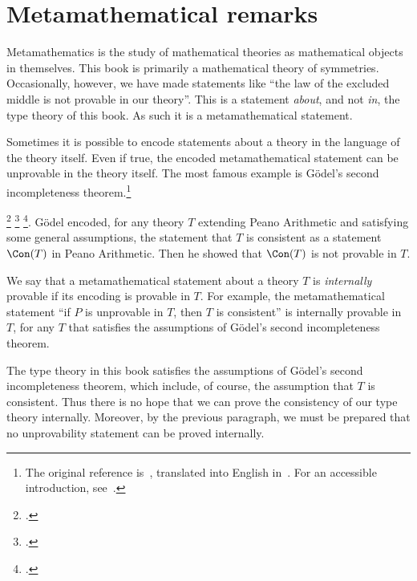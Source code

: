 \chapter{Metamathematical remarks}
\label{app:metamath}

Metamathematics is the study of mathematical theories as
mathematical objects in themselves.
This book is primarily a mathematical theory of symmetries.
Occasionally, however, we have made statements like
``the law of the excluded middle is not provable in our theory''.
This is a statement \emph{about}, and not \emph{in}, the type theory of this book.
As such it is a metamathematical statement.

Sometimes it is possible to encode statements
about a theory in the language of the theory itself.%
Even if true, the encoded metamathematical statement can
be unprovable in the theory itself.
The most famous example is G\"{o}del's second incompleteness theorem.\footnote{%
  The original reference is~\citeauthor{Goedel2nd}\footnotemark{},
  translated into English in~\citeauthor{Heijenoort-source}\footnotemark{}.
  For an accessible introduction, see~\citeauthor{Smullyan-Goedel}\footnotemark{}.}%
\addtocounter{footnote}{-3}%
\footcitetext{Goedel2nd}%
\footcitetext{Heijenoort-source}%
\footcitetext{Smullyan-Goedel}.
G\"{o}del encoded, for any theory $T$ extending Peano Arithmetic and satisfying
some general assumptions, the statement that $T$ is consistent as
a statement $\Con(T)$ in Peano Arithmetic.
Then he showed that $\Con(T)$ is not provable in $T$.

We say that a metamathematical statement about a theory $T$
is \emph{internally} provable if its encoding is provable in $T$.
For example, the metamathematical statement ``if $P$ is unprovable in $T$,
then $T$ is consistent'' is internally provable in $T$, for any $T$ that
satisfies the assumptions of G\"{o}del's second incompleteness theorem.

The type theory in this book satisfies the assumptions of
G\"{o}del's second incompleteness theorem, which include, of course,
the assumption that $T$ is consistent. Thus there is no hope
that we can prove the consistency of our type theory internally.
Moreover, by the previous paragraph, we must be prepared that
no unprovability statement can be proved internally.

